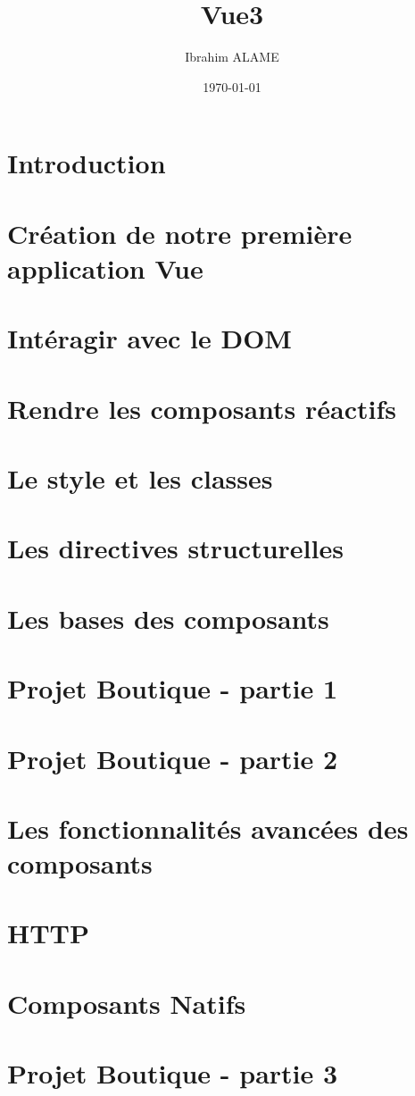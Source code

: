 \documentclass[a4paper]{book}
\title{Vue3}
\author{Ibrahim ALAME}
\date{\today}
\begin{document}
 
\maketitle

    \chapter{Introduction}
	

    \chapter{Création de notre première application Vue}
    
	\chapter{Intéragir avec le DOM}
		
	\chapter{Rendre les composants réactifs}
	
	\chapter{Le style et les classes}
	
	\chapter{Les directives structurelles}
	
	\chapter{Les bases des composants}
	
	\chapter{Projet Boutique - partie 1}
	
	\chapter{Projet Boutique - partie 2}
	
	\chapter{Les fonctionnalités avancées des composants}
	
	\chapter{HTTP}
	
	\chapter{Composants Natifs}
	
	\chapter{Projet Boutique - partie 3}
	
    \tableofcontents    

\end{document}
